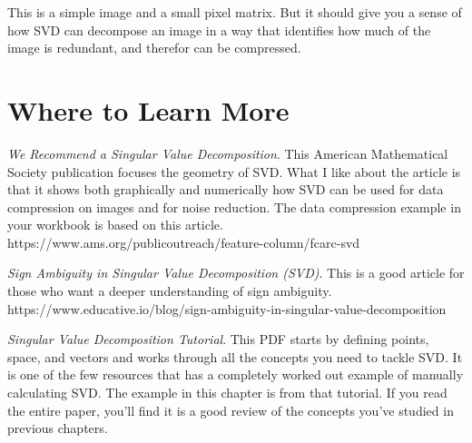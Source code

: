 This is a simple image and a small pixel matrix. But it should give you a sense of how SVD can decompose an image in a way that identifies how much of the image is redundant, and therefor can be compressed.

\section{Where to Learn More}
\emph {We Recommend a Singular Value Decomposition}. This American Mathematical Society publication focuses the geometry of SVD. What I like about the article is that it  shows both graphically and numerically how SVD can be used for data compression on images and for noise reduction. The data compression example in your workbook is based on this article. https://www.ams.org/publicoutreach/feature-column/fcarc-svd

\emph {Sign Ambiguity in Singular Value Decomposition (SVD)}. This is a good article for those who want a deeper understanding of sign ambiguity. https://www.educative.io/blog/sign-ambiguity-in-singular-value-decomposition

\emph {Singular Value Decomposition Tutorial}. This PDF starts by defining points, space, and vectors and works through all the concepts you need to tackle SVD. It is one of the few resources that has a completely worked out example of manually calculating SVD. The example in this chapter is from that tutorial. If you read the entire paper, you'll find it is a good review of the concepts you've studied in previous chapters. 
